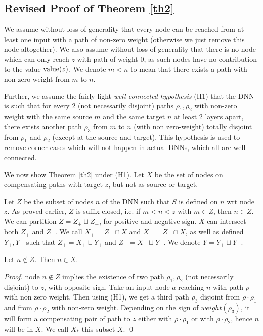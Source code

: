  			
		
			

\newpage

	
\subsection{Revised Proof of Theorem \ref{th2}}
			
We assume without loss of generality that every node can be reached from at least one input with a path of non-zero weight (otherwise we just remove this node altogether).
We also assume without loss of generality that there is no node which can only reach $z$ with path of weight $0$, as such nodes have no contribution to the value ${\textrm{value}}(z)$. We denote $m<n$ to mean that there exists a path with non zero weight from $m$ to $n$.

Further, we assume the fairly light {\em well-connected hypothesis} (H1) that the DNN is such that for every 2 (not necessarily disjoint) paths $\rho_1,\rho_2$ with non-zero weight with the same source $m$ and the same target $n$ at least 2 layers apart, there exists another path $\rho_3$ from $m$ to $n$ (with non zero-weight) totally disjoint from $\rho_1$ and $\rho_2$ (except at the source and target). This hypothesis is used to remove corner cases 
which will not happen in actual DNNs, which all are well-connected.

			\smallskip


			We now show Theorem \ref{th2} under (H1).
			Let $X$ be the set of nodes on compensating paths with target $z$, but not as source or target.
		
			Let $Z$ be the subset of nodes $n$ of the DNN such that $S$ is defined on $n$ 
			wrt node $z$. As proved earlier, $Z$ is suffix closed, i.e. if $m<n<z$ with $m \in Z$, then $n \in Z$. We can partition $Z = Z_{+} \sqcup Z_{-}$, for positive and negative sign. $X$ can intersect both $Z_+$ and $Z_-$.
			We call $X_+ = Z_+ \cap X$ and $X_-=Z_- \cap X$, as well as 
			defined $Y_+,Y_-$ such that $Z_+ = X_+ \sqcup Y_+$ and $Z_- = X_- \sqcup Y_-$.
			We denote $Y=Y_+ \sqcup Y_-$.
			
\begin{lemma}
 Let $n \notin Z$. Then $n \in X$.
\end{lemma}

\begin{proof}
			node $n \notin Z$ implies the existence of two path $\rho_1,\rho_2$ (not necessarily disjoint) to $z$, with opposite sign. 
			Take an input node $a$ reaching $n$ with path $\rho$ with non zero weight.
			Then using (H1), we get a third path $\rho_3$ disjoint from $\rho \cdot \rho_1$ and from $\rho \cdot \rho_2$ with non-zero weight. Depending on the sign of $weight(\rho_3)$, it will form a compensating pair of path to $z$ either with $\rho \cdot \rho_1$ or with $\rho \cdot \rho_2$, hence $n$ will be in $X$. We call $X_*$ this subset $X$. \qed
\end{proof}
			
